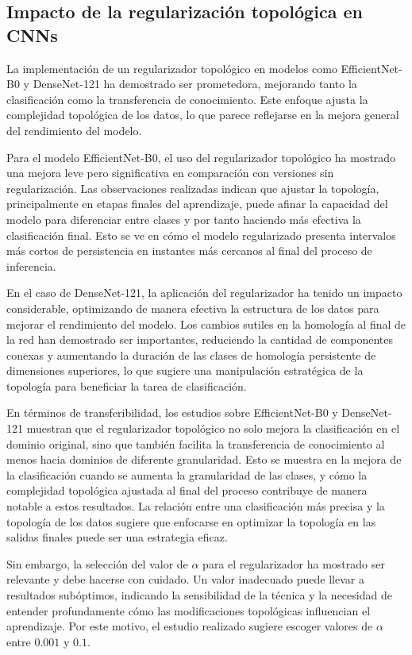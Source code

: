 \subsection{Impacto de la regularización topológica en CNNs}

La implementación de un regularizador topológico en modelos como EfficientNet-B0
y DenseNet-121 ha demostrado ser prometedora, mejorando tanto la clasificación como
la transferencia de conocimiento. Este enfoque ajusta la complejidad topológica
de los datos, lo que parece reflejarse en la mejora general del rendimiento del modelo.

Para el modelo EfficientNet-B0, el uso del regularizador topológico ha mostrado
una mejora leve pero significativa en comparación con versiones sin
regularización. Las observaciones realizadas indican que ajustar la topología,
principalmente en etapas finales del aprendizaje, puede afinar la capacidad del modelo
para diferenciar entre clases y por tanto haciendo más efectiva la clasificación
final. Esto se ve en cómo el modelo regularizado presenta intervalos más cortos
de persistencia en instantes más cercanos al final del proceso de inferencia.

En el caso de DenseNet-121, la aplicación del regularizador ha tenido un impacto
considerable, optimizando de manera efectiva la estructura de los datos para
mejorar el rendimiento del modelo. Los cambios sutiles en la homología al final de
la red han demostrado ser importantes, reduciendo la cantidad de componentes
conexas y aumentando la duración de las clases de homología persistente de
dimensiones superiores, lo que sugiere una manipulación estratégica de la topología
para beneficiar la tarea de clasificación.

En términos de transferibilidad, los estudios sobre EfficientNet-B0 y DenseNet-121
muestran que el regularizador topológico no solo mejora la clasificación en el
dominio original, sino que también facilita la transferencia de conocimiento al menos
hacia dominios de diferente granularidad. Esto se muestra en la mejora de la
clasificación cuando se aumenta la granularidad de las clases, y cómo la complejidad
topológica ajustada al final del proceso contribuye de manera notable a estos resultados.
La relación entre una clasificación más precisa y la topología de los datos
sugiere que enfocarse en optimizar la topología en las salidas finales puede ser
una estrategia eficaz.

Sin embargo, la selección del valor de $\alpha$ para el regularizador ha mostrado
ser relevante y debe hacerse con cuidado. Un valor inadecuado puede llevar a
resultados subóptimos, indicando la sensibilidad de la técnica y la necesidad de
entender profundamente cómo las modificaciones topológicas influencian el aprendizaje.
Por este motivo, el estudio realizado sugiere escoger valores de $\alpha$ entre $0
.001$ y $0.1$.

\endinput
